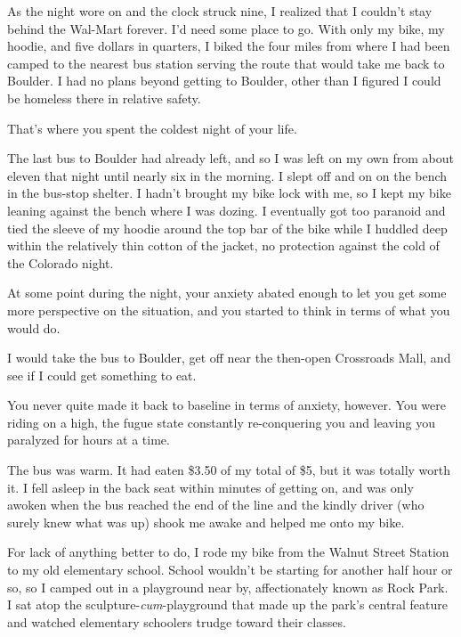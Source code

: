 \begin{paracol}{2}
\begin{leftcolumn}
As the night wore on and the clock struck nine, I realized that I couldn't stay behind the Wal-Mart forever. I'd need some place to go. With only my bike, my hoodie, and five dollars in quarters, I biked the four miles from where I had been camped to the nearest bus station serving the route that would take me back to Boulder. I had no plans beyond getting to Boulder, other than I figured I could be homeless there in relative safety.

\begin{ally}
That's where you spent the coldest night of your life.
\end{ally}
The last bus to Boulder had already left, and so I was left on my own from about eleven that night until nearly six in the morning. I slept off and on on the bench in the bus-stop shelter. I hadn't brought my bike lock with me, so I kept my bike leaning against the bench where I was dozing. I eventually got too paranoid and tied the sleeve of my hoodie around the top bar of the bike while I huddled deep within the relatively thin cotton of the jacket, no protection against the cold of the Colorado night.

\begin{ally}
At some point during the night, your anxiety abated enough to let you get some more perspective on the situation, and you started to think in terms of what you would do.
\end{ally}
I would take the bus to Boulder, get off near the then-open Crossroads Mall, and see if I could get something to eat.

\begin{ally}
You never quite made it back to baseline in terms of anxiety, however. You were riding on a high, the fugue state constantly re-conquering you and leaving you paralyzed for hours at a time.
\end{ally}
The bus was warm. It had eaten \$3.50 of my total of \$5, but it was totally worth it. I fell asleep in the back seat within minutes of getting on, and was only awoken when the bus reached the end of the line and the kindly driver (who surely knew what was up) shook me awake and helped me onto my bike.

For lack of anything better to do, I rode my bike from the Walnut Street Station to my old elementary school. School wouldn't be starting for another half hour or so, so I camped out in a playground near by, affectionately known as Rock Park. I sat atop the sculpture-\emph{cum}-playground that made up the park's central feature and watched elementary schoolers trudge toward their classes.


\end{leftcolumn}
\end{paracol}
